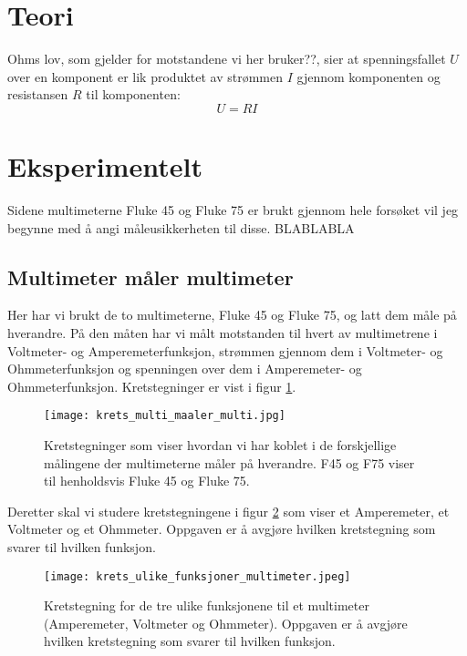 \documentclass[reprint, english,notitlepage]{revtex4-1}  %
\begin{document}
\section{Teori}

Ohms lov, som gjelder for motstandene vi her bruker??, sier at spenningsfallet $U$ over en komponent er lik produktet av strømmen $I$ gjennom komponenten og resistansen $R$ til komponenten:
\begin{equation}
  \label{eq:ohms_lov}
  U = R I
\end{equation}



\section{Eksperimentelt}

Sidene multimeterne Fluke 45 og Fluke 75 er brukt gjennom hele forsøket vil jeg begynne med å angi måleusikkerheten til disse. BLABLABLA

\subsection{Multimeter måler multimeter}
Her har vi brukt de to multimeterne, Fluke 45 og Fluke 75, og latt dem måle på hverandre. På den måten har vi målt motstanden til hvert av multimetrene i Voltmeter- og Amperemeterfunksjon, strømmen gjennom dem i Voltmeter- og Ohmmeterfunksjon og spenningen over dem i Amperemeter- og Ohmmeterfunksjon. Kretstegninger er vist i figur \ref{fig:krets_multi_maaler_multi}.
\begin{figure}
  \texttt{[image: krets\_multi\_maaler\_multi.jpg]}
  \caption{Kretstegninger som viser hvordan vi har koblet i de forskjellige målingene der multimeterne måler på hverandre. F45 og F75 viser til henholdsvis Fluke 45 og Fluke 75.}
  \label{fig:krets_multi_maaler_multi}
\end{figure}

Deretter skal vi studere kretstegningene i figur \ref{fig:krets_ulike_funksjoner_multimeter} som viser et Amperemeter, et Voltmeter og et Ohmmeter. Oppgaven er å avgjøre hvilken kretstegning som svarer til hvilken funksjon.
\begin{figure}
  \texttt{[image: krets\_ulike\_funksjoner\_multimeter.jpeg]}
  \caption{Kretstegning for de tre ulike funksjonene til et multimeter (Amperemeter, Voltmeter og Ohmmeter). Oppgaven er å avgjøre hvilken kretstegning som svarer til hvilken funksjon.}
  \label{fig:krets_ulike_funksjoner_multimeter}
\end{figure}
\end{document}
